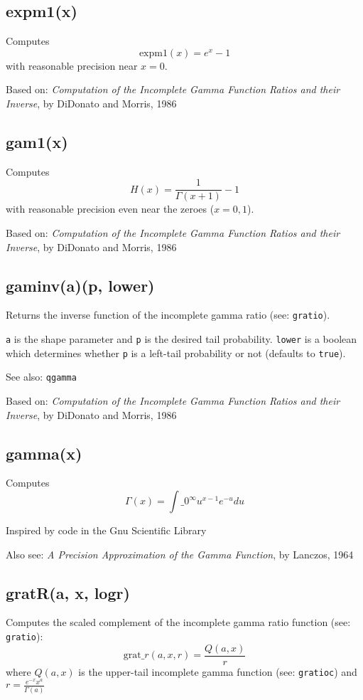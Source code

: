 \documentclass{article}
\begin{document}
    \subsection*{expm1(x)}
    Computes $$\textrm{expm1}(x) = e^x - 1$$ with reasonable precision near $x = 0$.


Based on:  \emph{Computation of the Incomplete Gamma Function Ratios
and their Inverse}, by DiDonato and Morris, 1986


    \subsection*{gam1(x)}
    Computes $$H(x)=\frac{1}{\Gamma(x+1)} - 1$$ with reasonable precision even near
the zeroes ($x = 0, 1$).


Based on:  \emph{Computation of the Incomplete Gamma Function Ratios
and their Inverse}, by DiDonato and Morris, 1986


    \subsection*{gaminv(a)(p, lower)}
    Returns the inverse function
of the incomplete gamma ratio (see: \texttt{gratio}).


\texttt{a} is the shape parameter and \texttt{p} is the desired tail probability.
\texttt{lower} is a boolean which determines whether \texttt{p} is a left-tail
probability or not (defaults to \texttt{true}).


See also: \texttt{qgamma}


Based on:  \emph{Computation of the Incomplete Gamma Function Ratios
and their Inverse}, by DiDonato and Morris, 1986


    \subsection*{gamma(x)}
    Computes $$\Gamma(x) = \int\_0^\infty u^{x-1} e^{-u} du$$


Inspired by code in the Gnu Scientific Library


Also see: \emph{A Precision Approximation of the Gamma Function}, by
Lanczos, 1964


    \subsection*{gratR(a, x, logr)}
    Computes the scaled complement of the incomplete gamma ratio function
(see: \texttt{gratio}): $$\textrm{grat}\_r(a,x,r) =  \frac{Q(a,x)}{r}$$
where
              $Q(a,x)$ is the upper-tail incomplete gamma function
(see: \texttt{gratioc}) and  $r = \frac{e^{-x} x^a}{\Gamma(a)}$
\end{document}
